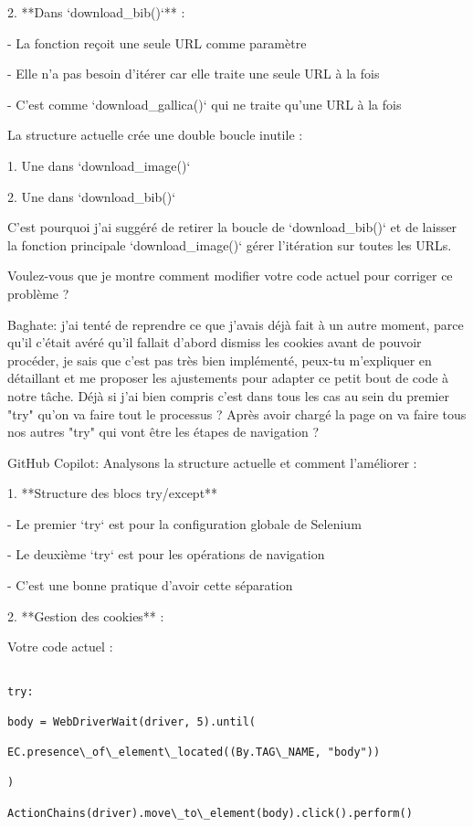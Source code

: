 2. **Dans `download\_bib()`** :

- La fonction reçoit une seule URL comme paramètre

- Elle n'a pas besoin d'itérer car elle traite une seule URL à la fois

- C'est comme `download\_gallica()` qui ne traite qu'une URL à la fois

La structure actuelle crée une double boucle inutile :

1. Une dans `download\_image()`

2. Une dans `download\_bib()`

C'est pourquoi j'ai suggéré de retirer la boucle de `download\_bib()` et de laisser la fonction principale `download\_image()` gérer l'itération sur toutes les URLs.

Voulez-vous que je montre comment modifier votre code actuel pour corriger ce problème ?

Baghate: j'ai tenté de reprendre ce que j'avais déjà fait à un autre moment, parce qu'il c'était avéré qu'il fallait d'abord dismiss les cookies avant de pouvoir procéder, je sais que c'est pas très bien implémenté, peux-tu m'expliquer en détaillant et me proposer les ajustements pour adapter ce petit bout de code à notre tâche. Déjà si j'ai bien compris c'est dans tous les cas au sein du premier "try" qu'on va faire tout le processus ? Après avoir chargé la page on va faire tous nos autres "try" qui vont être les étapes de navigation ?

GitHub Copilot: Analysons la structure actuelle et comment l'améliorer :

1. **Structure des blocs try/except**

- Le premier `try` est pour la configuration globale de Selenium

- Le deuxième `try` est pour les opérations de navigation

- C'est une bonne pratique d'avoir cette séparation

2. **Gestion des cookies** :

Votre code actuel :

\begin{verbatim}

try:

body = WebDriverWait(driver, 5).until(

EC.presence\_of\_element\_located((By.TAG\_NAME, "body"))

)

ActionChains(driver).move\_to\_element(body).click().perform()

\end{verbatim}

